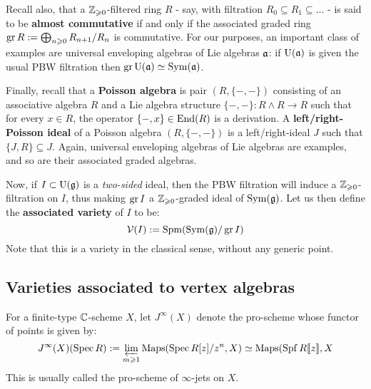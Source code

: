         Recall also, that a $\mathbb{Z}_{\geqslant 0}$-filtered ring $R$ - say, with filtration $R_0 \subseteq R_1 \subseteq ...$ - is said to be \textbf{almost commutative} if and only if the associated graded ring $\operatorname{gr} R := \bigoplus_{n \geqslant 0} R_{n + 1}/R_n$ is commutative. For our purposes, an important class of examples are universal enveloping algebras of Lie algebras $\mathfrak{a}$: if $\mathrm{U}(\mathfrak{a})$ is given the usual PBW filtration then $\operatorname{gr} \mathrm{U}(\mathfrak{a}) \simeq \mathrm{Sym}(\mathfrak{a})$. 

        Finally, recall that a \textbf{Poisson algebra} is pair $(R, \{-, -\})$ consisting of an associative algebra $R$ and a Lie algebra structure $\{-, -\}: R \wedge R \to R$ such that for every $x \in R$, the operator $\{-, x\} \in \mathrm{End}(R)$ is a derivation. A \textbf{left/right-Poisson ideal} of a Poisson algebra $(R, \{-, -\})$ is a left/right-ideal $J$ such that $\{J, R\} \subseteq J$. Again, universal enveloping algebras of Lie algebras are examples, and so are their associated graded algebras.

        Now, if $I \subset \mathrm{U}(\mathfrak{g})$ is a \textit{two-sided} ideal, then the PBW filtration will induce a $\mathbb{Z}_{\geqslant 0}$-filtration on $I$, thus making $\operatorname{gr} I$ a $\mathbb{Z}_{\geqslant 0}$-graded ideal of $\mathrm{Sym}(\mathfrak{g})$. Let us then define the \textbf{associated variety} of $I$ to be:
            $$\mathcal{V}(I) := \operatorname{Spm}( \mathrm{Sym}(\mathfrak{g})/\operatorname{gr} I )$$
        Note that this is a variety in the classical sense, without any generic point.

    \subsection{Varieties associated to vertex algebras}
        For a finite-type $\mathbb{C}$-scheme $X$, let $J^{\infty}(X)$ denote the pro-scheme whose functor of points is given by:
            $$J^{\infty}(X)(\operatorname{Spec} R) := \varprojlim_{m \geqslant 1} \mathrm{Maps}(\operatorname{Spec} R[z]/z^n, X) \simeq \mathrm{Maps}( \operatorname{Spf} R[\![z]\!], X $$
        This is usually called the pro-scheme of $\infty$-jets on $X$.

